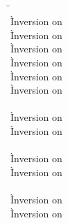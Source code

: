 \begin{description}
\begin{tabbing}
  \end{tabbing}

\item[\rulesteppopiffalse] \ \\
  \begin{tabbing}
  \hspace{3em} \= \hspace{3em} \= \\
    \` Inversion on  \\
    \` Inversion on  \\
    \` Inversion on  \\
    \` Inversion on  \\
    \` Inversion on  \\
    \` Inversion on  \\
  \\
    \` Inversion on  \\
    \` Inversion on  \\
   \\
    \` Inversion on  \\
    \` Inversion on  \\
   \\
    \` Inversion on  \\
    \` Inversion on  \\

\end{tabbing}
\end{description}
